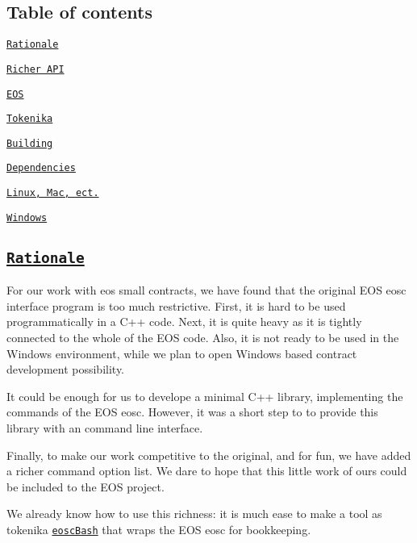 \label{_toc}%
 \subsection*{Table of contents}


\begin{DoxyItemize}
\item \href{#rationale}{\tt Rationale}
\begin{DoxyItemize}
\item \href{#richer}{\tt Richer A\+PI}
\begin{DoxyItemize}
\item \href{#richereos}{\tt E\+OS}
\item \href{#richertokenika}{\tt Tokenika}
\end{DoxyItemize}
\end{DoxyItemize}
\item \href{#building}{\tt Building}
\begin{DoxyItemize}
\item \href{#dependencies}{\tt Dependencies}
\item \href{#linux}{\tt Linux, Mac, ect.}
\item \href{#windows}{\tt Windows}
\end{DoxyItemize}
\end{DoxyItemize}

\label{_rationale}%
 \subsection*{\href{#toc}{\tt Rationale}}

For our work with eos small contracts, we have found that the original E\+OS {\ttfamily eosc} interface program is too much restrictive. First, it is hard to be used programmatically in a C++ code. Next, it is quite heavy as it is tightly connected to the whole of the E\+OS code. Also, it is not ready to be used in the Windows environment, while we plan to open Windows based contract development possibility.

It could be enough for us to develope a minimal C++ library, implementing the commands of the E\+OS {\ttfamily eosc}. However, it was a short step to to provide this library with an command line interface.

Finally, to make our work competitive to the original, and for fun, we have added a richer command option list. We dare to hope that this little work of ours could be included to the E\+OS project.

We already know how to use this richness\+: it is much ease to make a tool as tokenika \href{#}{\tt {\ttfamily eosc\+Bash}} that wraps the E\+OS {\ttfamily eosc} for bookkeeping.

